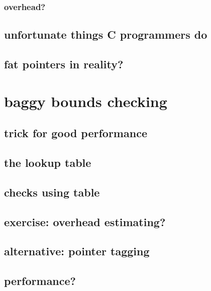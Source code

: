 \subsubsection{overhead?}


\subsection{unfortunate things C programmers do}


\subsection{fat pointers in reality?}


\section{baggy bounds checking}


\subsection{trick for good performance}


\subsection{the lookup table}


\subsection{checks using table}


\subsection{exercise: overhead estimating?}


\subsection{alternative: pointer tagging}


\subsection{performance?}



